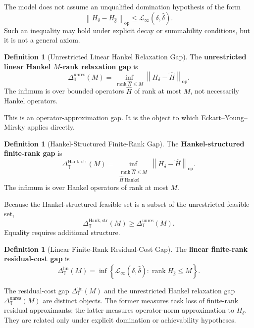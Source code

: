 \documentclass[12pt]{article}
\theoremstyle{definition}
\newtheorem{definition}[theorem]{Definition}
\newcommand{\norm}[1]{\left\lVert#1\right\rVert}
\begin{document}
The model does not assume an unqualified domination hypothesis of the form
\[
\norm{H_\delta-H_{\widehat\delta}}_{\mathrm{op}}
\le
\mathcal L_\infty(\delta,\widehat\delta).
\]
Such an inequality may hold under explicit decay or summability conditions,
but it is not a general axiom.

\begin{definition}[Unrestricted Linear Hankel Relaxation Gap]
\label{def:linear-hankel-gap}
The \textbf{unrestricted linear Hankel $M$-rank relaxation gap} is
\[
\Delta_{\mathbb T}^{\mathrm{unres}}(M)
=
\inf_{\operatorname{rank}\widehat H\le M}
\norm{H_\delta-\widehat H}_{\mathrm{op}}.
\]
The infimum is over bounded operators $\widehat H$ of rank at most $M$, not
necessarily Hankel operators.
\end{definition}

This is an operator-approximation gap.  It is the object to which
Eckart--Young--Mirsky \cite{eckart1936,mirsky1960} applies directly.

\begin{definition}[Hankel-Structured Finite-Rank Gap]
\label{def:hankel-structured-gap}
The \textbf{Hankel-structured finite-rank gap} is
\[
\Delta_{\mathbb T}^{\mathrm{Hank,str}}(M)
=
\inf_{\substack{
\operatorname{rank}\widehat H\le M\\
\widehat H\ \text{Hankel}
}}
\norm{H_\delta-\widehat H}_{\mathrm{op}}.
\]
The infimum is over Hankel operators of rank at most $M$.
\end{definition}

Because the Hankel-structured feasible set is a subset of the unrestricted
feasible set,
\[
\Delta_{\mathbb T}^{\mathrm{Hank,str}}(M)
\ge
\Delta_{\mathbb T}^{\mathrm{unres}}(M).
\]
Equality requires additional structure.

\begin{definition}[Linear Finite-Rank Residual-Cost Gap]
\label{def:lin-finite-rank-gap}
The \textbf{linear finite-rank residual-cost gap} is
\[
\Delta_{\mathbb T}^{\mathrm{lin}}(M)
=
\inf
\left\{
\mathcal L_\infty(\delta,\widehat\delta):
\operatorname{rank}H_{\widehat\delta}\le M
\right\}.
\]
\end{definition}

The residual-cost gap $\Delta_{\mathbb T}^{\mathrm{lin}}(M)$ and the
unrestricted Hankel relaxation gap
$\Delta_{\mathbb T}^{\mathrm{unres}}(M)$ are distinct objects.  The former
measures task loss of finite-rank residual approximants; the latter measures
operator-norm approximation to $H_\delta$.  They are related only under
explicit domination or achievability hypotheses.
\end{document}

